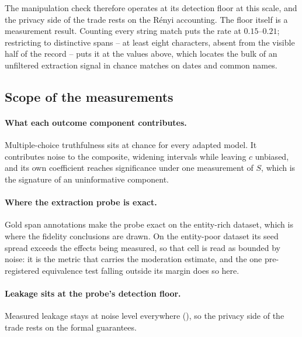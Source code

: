 The manipulation check therefore operates at its detection floor at this scale,
and the privacy side of the trade rests on the R\'enyi accounting.
The floor itself is a measurement result.
Counting every string match puts the rate at $0.15$--$0.21$;
restricting to distinctive spans -- at least eight characters,
absent from the visible half of the record -- puts it at the values above,
which locates the bulk of an unfiltered extraction signal in chance matches on dates and common names.

\subsection{Scope of the measurements}
\paragraph{What each outcome component contributes.}
Multiple-choice truthfulness sits at chance for every adapted model.
It contributes noise to the composite,
widening intervals while leaving $c$ unbiased,
and its own coefficient reaches significance under one measurement of $S$,
which is the signature of an uninformative component.

\paragraph{Where the extraction probe is exact.}
Gold span annotations make the probe exact on the entity-rich dataset,
which is where the fidelity conclusions are drawn.
On the entity-poor dataset its seed spread exceeds the effects being measured,
so that cell is read as bounded by noise:
it is the metric that carries the moderation estimate,
and the one pre-registered equivalence test falling outside its margin does so here.

\paragraph{Leakage sits at the probe's detection floor.}
Measured leakage stays at noise level everywhere (),
so the privacy side of the trade rests on the formal guarantees.

